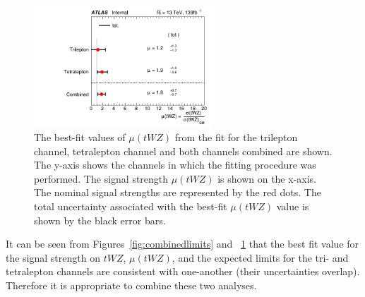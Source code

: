\begin{figure}
    \centering
    \includegraphics[width=0.6\textwidth]{figures/combined/POI_SigXsecOverSM_.png}
       \caption{The best-fit values of $\mu (tWZ)$ from the fit for the trilepton channel, tetralepton channel and both channels combined are shown. The y-axis shows the channels in which the fitting procedure was performed. The signal strength $\mu (tWZ)$ is shown on the x-axis. The nominal signal strengths are represented by the red dots. The total uncertainty associated with the best-fit $\mu (tWZ)$ value is shown by the black error bars.}
        \label{fig:combinedPOI}
\end{figure}
It can be seen from Figures~\ref{fig:combinedlimits} and ~\ref{fig:combinedPOI} that the best fit value for the signal strength on $tWZ$, $\mu (tWZ)$, and the expected limits for the tri- and tetralepton channels are consistent with one-another (their uncertainties overlap). Therefore it is appropriate to combine these two analyses.\\\\

